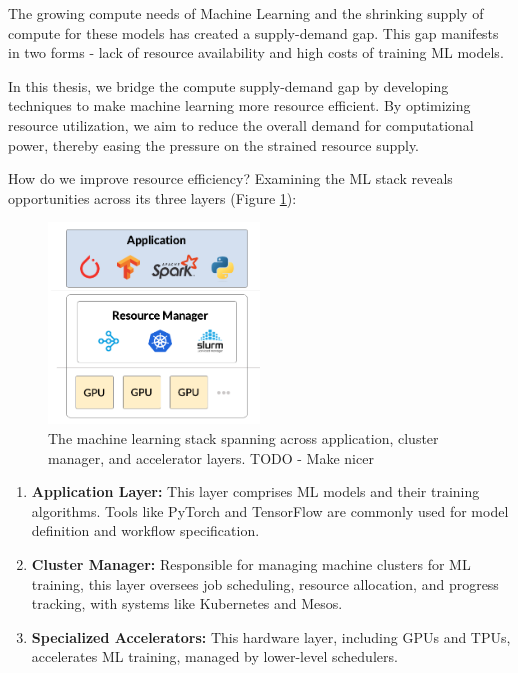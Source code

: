 The growing compute needs of Machine Learning and the shrinking supply of compute for these models has created a supply-demand gap. This gap manifests in two forms - lack of resource availability and high costs of training ML models.  

In this thesis, we bridge the compute supply-demand gap by developing techniques to make machine learning more resource efficient. By optimizing resource utilization, we aim to reduce the overall demand for computational power, thereby easing the pressure on the strained resource supply.

How do we improve resource efficiency? Examining the ML stack reveals opportunities across its three layers (Figure \ref{fig:ml_stack}):

\begin{figure}
    \centering
    \includegraphics[width=0.5\textwidth]{intro/figures/MLStack.png}
    \caption{The machine learning stack spanning across application, cluster manager, and accelerator layers. TODO - Make nicer \fillme{}}
    \label{fig:ml_stack}
\end{figure}

\begin{enumerate}
\item \textbf{Application Layer:} This layer comprises ML models and their training algorithms. Tools like PyTorch and TensorFlow are commonly used for model definition and workflow specification.

\item \textbf{Cluster Manager:} Responsible for managing machine clusters for ML training, this layer oversees job scheduling, resource allocation, and progress tracking, with systems like Kubernetes and Mesos. 

\item \textbf{Specialized Accelerators:} This hardware layer, including GPUs and TPUs, accelerates ML training, managed by lower-level schedulers. 
\end{enumerate}

